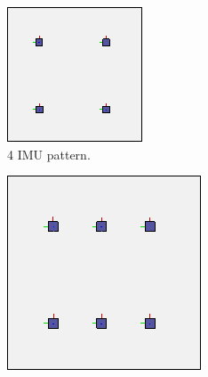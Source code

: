 \begin{figure}[h!]
\begin{subfigure}[b]{0.2\linewidth}
    \includegraphics[width=\linewidth]{figures/IMU4.png}
    \caption{4 IMU pattern.}
  \end{subfigure}
\begin{subfigure}[b]{0.2\linewidth}
    \includegraphics[width=\linewidth]{figures/IMU6.png}

\end{subfigure}
\end{figure}
